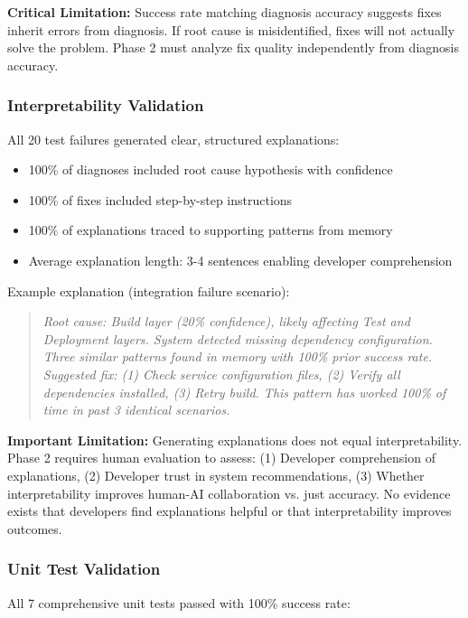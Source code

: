 \documentclass[11pt]{article}
\begin{document}
\textbf{Critical Limitation:} Success rate matching diagnosis accuracy suggests fixes inherit errors from diagnosis. If root cause is misidentified, fixes will not actually solve the problem. Phase 2 must analyze fix quality independently from diagnosis accuracy.

\subsubsection{Interpretability Validation}

All 20 test failures generated clear, structured explanations:

\begin{itemize}
    \item 100\% of diagnoses included root cause hypothesis with confidence
    \item 100\% of fixes included step-by-step instructions
    \item 100\% of explanations traced to supporting patterns from memory
    \item Average explanation length: 3-4 sentences enabling developer comprehension
\end{itemize}

Example explanation (integration failure scenario):
\begin{quote}
\textit{Root cause: Build layer (20\% confidence), likely affecting Test and Deployment layers. System detected missing dependency configuration. Three similar patterns found in memory with 100\% prior success rate. Suggested fix: (1) Check service configuration files, (2) Verify all dependencies installed, (3) Retry build. This pattern has worked 100\% of time in past 3 identical scenarios.}
\end{quote}

\textbf{Important Limitation:} Generating explanations does not equal interpretability. Phase 2 requires human evaluation to assess: (1) Developer comprehension of explanations, (2) Developer trust in system recommendations, (3) Whether interpretability improves human-AI collaboration vs. just accuracy. No evidence exists that developers find explanations helpful or that interpretability improves outcomes.

\subsubsection{Unit Test Validation}

All 7 comprehensive unit tests passed with 100\% success rate:
\end{document}
